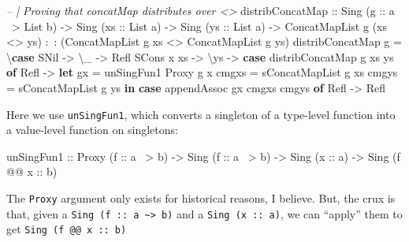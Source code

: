 \documentclass[]{article}
\newenvironment{Shaded}{}{}
\newcommand{\KeywordTok}[1]{\textcolor[rgb]{0.00,0.44,0.13}{\textbf{{#1}}}}
\newcommand{\DataTypeTok}[1]{\textcolor[rgb]{0.56,0.13,0.00}{{#1}}}
\newcommand{\CommentTok}[1]{\textcolor[rgb]{0.38,0.63,0.69}{\textit{{#1}}}}
\newcommand{\OtherTok}[1]{\textcolor[rgb]{0.00,0.44,0.13}{{#1}}}
\newcommand{\FunctionTok}[1]{\textcolor[rgb]{0.02,0.16,0.49}{{#1}}}
\newcommand{\NormalTok}[1]{{#1}}
\begin{document}
\begin{Shaded}
\begin{Highlighting}[]
\CommentTok{-- | Proving that concatMap distributes over <>}
\NormalTok{distribConcatMap}
\OtherTok{    ::} \DataTypeTok{Sing} \NormalTok{(}\OtherTok{g ::} \NormalTok{a }\FunctionTok{~>} \DataTypeTok{List} \NormalTok{b)}
    \OtherTok{->} \DataTypeTok{Sing} \NormalTok{(}\OtherTok{xs ::} \DataTypeTok{List} \NormalTok{a)}
    \OtherTok{->} \DataTypeTok{Sing} \NormalTok{(}\OtherTok{ys ::} \DataTypeTok{List} \NormalTok{a)}
    \OtherTok{->} \DataTypeTok{ConcatMapList} \NormalTok{g (xs }\FunctionTok{<>} \NormalTok{ys) }\FunctionTok{:~:} \NormalTok{(}\DataTypeTok{ConcatMapList} \NormalTok{g xs }\FunctionTok{<>} \DataTypeTok{ConcatMapList} \NormalTok{g ys)}
\NormalTok{distribConcatMap g }\FunctionTok{=} \NormalTok{\textbackslash{}}\KeywordTok{case}
    \DataTypeTok{SNil} \OtherTok{->} \NormalTok{\textbackslash{}_ }\OtherTok{->} \DataTypeTok{Refl}
    \DataTypeTok{SCons} \NormalTok{x xs }\OtherTok{->} \NormalTok{\textbackslash{}ys }\OtherTok{->}
      \KeywordTok{case} \NormalTok{distribConcatMap g xs ys }\KeywordTok{of}
        \DataTypeTok{Refl} \OtherTok{->}
          \KeywordTok{let} \NormalTok{gx    }\FunctionTok{=} \NormalTok{unSingFun1 }\DataTypeTok{Proxy} \NormalTok{g x}
              \NormalTok{cmgxs }\FunctionTok{=} \NormalTok{sConcatMapList g xs}
              \NormalTok{cmgys }\FunctionTok{=} \NormalTok{sConcatMapList g ys}
          \KeywordTok{in}  \KeywordTok{case} \NormalTok{appendAssoc gx cmgxs cmgys }\KeywordTok{of}
                \DataTypeTok{Refl} \OtherTok{->} \DataTypeTok{Refl}
\end{Highlighting}
\end{Shaded}

Here we use \texttt{unSingFun1}, which converts a singleton of a type-level
function into a value-level function on singletons:

\begin{Shaded}
\begin{Highlighting}[]
\NormalTok{unSingFun1}
\OtherTok{    ::} \DataTypeTok{Proxy} \NormalTok{(}\OtherTok{f      ::} \NormalTok{a }\FunctionTok{~>} \NormalTok{b)}
    \OtherTok{->} \DataTypeTok{Sing}  \NormalTok{(}\OtherTok{f      ::} \NormalTok{a }\FunctionTok{~>} \NormalTok{b)}
    \OtherTok{->} \DataTypeTok{Sing}  \NormalTok{(}\OtherTok{x      ::} \NormalTok{a)}
    \OtherTok{->} \DataTypeTok{Sing}  \NormalTok{(f }\FunctionTok{@@}\OtherTok{ x ::} \NormalTok{b)}
\end{Highlighting}
\end{Shaded}

The \texttt{Proxy} argument only exists for historical reasons, I believe. But,
the crux is that, given a
\texttt{Sing\ (f\ ::\ a\ \textasciitilde{}\textgreater{}\ b)} and a
\texttt{Sing\ (x\ ::\ a)}, we can ``apply'' them to get
\texttt{Sing\ (f\ @@\ x\ ::\ b)}
\end{document}
